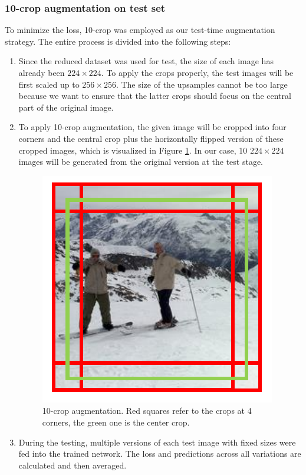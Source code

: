 \documentclass{article}
\begin{document}
\subsubsection{10-crop augmentation on test set}
To minimize the loss, 10-crop was employed as our test-time augmentation strategy. The entire process is divided into the following steps: 
\begin{enumerate}
    \item Since the reduced dataset was used for test, the size of each image has already been $224 \times 224$. To apply the crops properly, the test images will be first scaled up to $256 \times 256$. The size of the upsamples cannot be too large because we want to ensure that the latter crops should focus on the central part of the original image. 
    
    \item To apply 10-crop augmentation, the given image will be cropped into four corners and the central crop plus the horizontally flipped version of these cropped images, which is visualized in Figure \ref{10-crop}. In our case, 10 $224 \times 224$ images will be generated from the original version at the test stage. 
    
    \begin{figure}[htbp]
\centerline{\includegraphics[scale=0.5]{10-crop.pdf}}
\caption{10-crop augmentation. Red squares refer to the crops at 4 corners, the green one is the center crop.}
\label{10-crop}
\end{figure}
    
    \item During the testing, multiple versions of each test image with fixed sizes were fed into the trained network. The loss and predictions across all variations are calculated and then averaged.
\end{enumerate}
\end{document}
